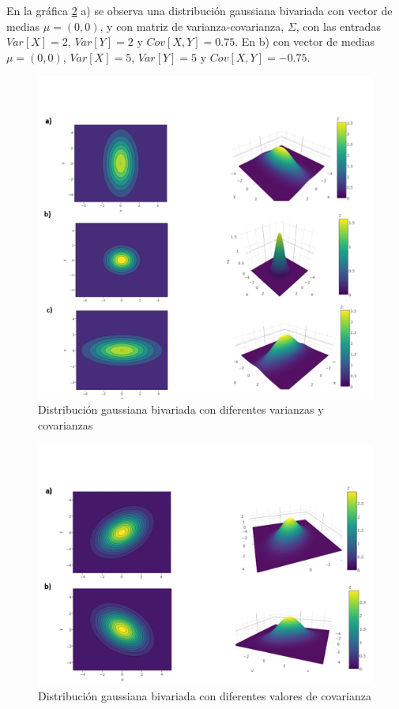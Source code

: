 En la gráfica \ref{fig:NPcor} a) se observa una distribución gaussiana bivariada con vector de medias $\mu=(0,0)$, y con matriz de varianza-covarianza, $\Sigma$, con las entradas $Var[X]=2$, $Var[Y]=2$ y $Cov[X,Y]=0.75$. En b) con vector de medias $\mu=(0,0)$, $Var[X]=5$, $Var[Y]=5$ y $Cov[X,Y]=-0.75$. 

\begin{figure}[ht]
	\centering
	\includegraphics[width=.9\linewidth]{Figuras/NPMsd}
	\caption{Distribución gaussiana bivariada con diferentes varianzas y covarianzas}
	\label{fig:NPMsd}
\end{figure}

\begin{figure}[ht]
	\centering
	\includegraphics[width=.9\linewidth]{Figuras/NPcor}
	\caption{Distribución gaussiana bivariada con diferentes valores de covarianza }
	\label{fig:NPcor}
\end{figure}


